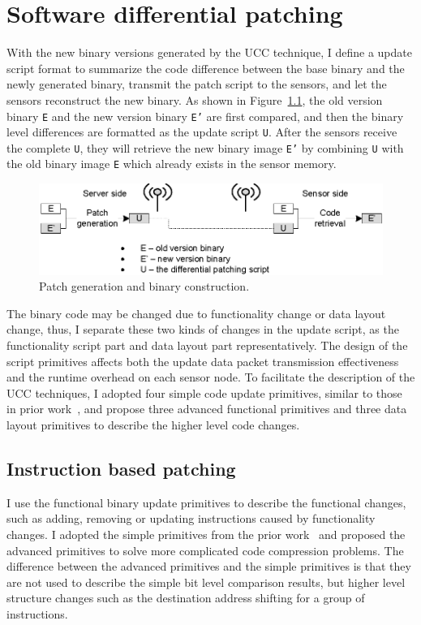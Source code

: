 \chapter{Software differential patching}
With the new binary versions generated by the UCC technique, I define a update script format to summarize the code difference between the base binary and the newly generated binary, transmit the patch script to the sensors, and let the sensors reconstruct the new binary. As shown in Figure~\ref{patch}, the old version binary \texttt{E} and the new version binary \texttt{E'} are first compared, and then the binary level differences are formatted as the update script \texttt{U}. After the sensors receive the complete \texttt{U}, they will retrieve the new binary image \texttt{E'} by combining \texttt{U} with the old binary image \texttt{E} which already exists in the sensor memory.

\begin{figure}[htbp]
\centering
\includegraphics[scale=1.2]{figures/patch.eps}
\caption{Patch generation and binary construction.}
\label{patch}
\end{figure}


The binary code may be changed due to functionality change or data layout change, thus, I separate these two kinds of changes in the update script, as the functionality script part and data layout part representatively.
The design of the script primitives affects both the update data packet transmission effectiveness and the runtime overhead on each sensor node. To facilitate the description of the UCC techniques, I adopted four simple code update primitives, similar to those in prior work~\cite{related:script}, and propose three advanced functional primitives and three data layout primitives to describe the higher level code changes. 

\section {Instruction based patching}

I use the functional binary update primitives to describe the functional changes, such as adding, removing or updating instructions caused by functionality changes. 
I adopted the simple primitives from the prior work~\cite{related:script} and proposed the advanced primitives to solve more complicated code compression problems. The difference between the advanced primitives and the simple primitives is that they are not used to describe the simple bit level comparison results, but higher level structure changes such as the destination address shifting for a group of instructions.

